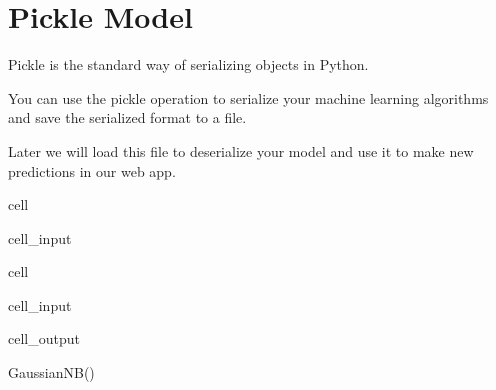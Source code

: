 \documentclass[letterpaper,10pt,english]{jupyterBook}
\begin{document}
\section{Pickle Model}
\label{\detokenize{Model_evaluation:pickle-model}}
\sphinxAtStartPar
Pickle is the standard way of serializing objects in Python.

\sphinxAtStartPar
You can use the pickle operation to serialize your machine learning algorithms and save the serialized format to a file.

\sphinxAtStartPar
Later we will load this file to deserialize your model and use it to make new predictions in our web app.

\begin{sphinxuseclass}{cell}\begin{sphinxVerbatimInput}

\begin{sphinxuseclass}{cell_input}
\begin{sphinxVerbatim}[commandchars=\\\{\}]
    
\end{sphinxVerbatim}

\end{sphinxuseclass}\end{sphinxVerbatimInput}

\end{sphinxuseclass}
\begin{sphinxuseclass}{cell}\begin{sphinxVerbatimInput}

\begin{sphinxuseclass}{cell_input}
\begin{sphinxVerbatim}[commandchars=\\\{\}]
 
\end{sphinxVerbatim}

\end{sphinxuseclass}\end{sphinxVerbatimInput}
\begin{sphinxVerbatimOutput}

\begin{sphinxuseclass}{cell_output}
\begin{sphinxVerbatim}[commandchars=\\\{\}]
GaussianNB()
\end{sphinxVerbatim}

\end{sphinxuseclass}\end{sphinxVerbatimOutput}

\end{sphinxuseclass}
\end{document}
